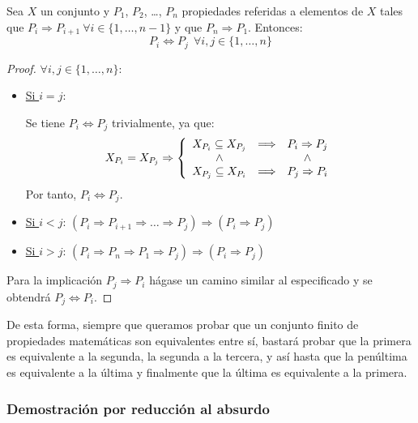 \begin{prop}
    Sea $X$ un conjunto y $P_1$, $P_2$, \ldots, $P_n$ propiedades referidas a elementos de $X$ tales que $P_i \Longrightarrow P_{i+1}~\forall i \in \{1, \ldots, n-1\}$ y que $P_n \Longrightarrow P_1$. Entonces:
    $$P_i \Longleftrightarrow P_j~~\forall i, j \in \{1, \ldots, n\}$$
\end{prop}
\begin{proof}
    $\forall i,j \in \{1, \ldots, n\}$:
    \begin{itemize}
        \item \underline{Si $i = j$}:

        Se tiene $P_i \Leftrightarrow P_j$ trivialmente, ya que:
        \begin{equation*}
            X_{P_i} = X_{P_j} \Rightarrow \left\{
            \begin{array}{ccc}
                X_{P_i} \subseteq X_{P_j} & \Longrightarrow & P_i \Rightarrow P_j \\
                \ \land \  && \ \land \ \\
                X_{P_j} \subseteq X_{P_i} & \Longrightarrow & P_j \Rightarrow P_i
            \end{array}
            \right.
        \end{equation*}
        Por tanto, $P_i \Leftrightarrow P_j$.

        \item \underline{Si $i < j$}: $(P_i \Rightarrow P_{i+1} \Rightarrow \ldots \Rightarrow P_j) \Rightarrow (P_i \Rightarrow P_j)$

        \item \underline{Si $i > j$}: $(P_i \Rightarrow P_n \Rightarrow P_1 \Rightarrow P_j) \Rightarrow (P_i \Rightarrow P_j)$
    \end{itemize}
    
    Para la implicación $P_j \Rightarrow P_i$ hágase un camino similar al especificado y se obtendrá $P_j \Leftrightarrow P_i$.
\end{proof}
De esta forma, siempre que queramos probar que un conjunto finito de propiedades matemáticas son equivalentes entre sí, bastará probar que la primera es equivalente a la segunda, la segunda a la tercera, y así hasta que la penúltima es equivalente a la última y finalmente que la última es equivalente a la primera.

\subsubsection{Demostración por reducción al absurdo}

